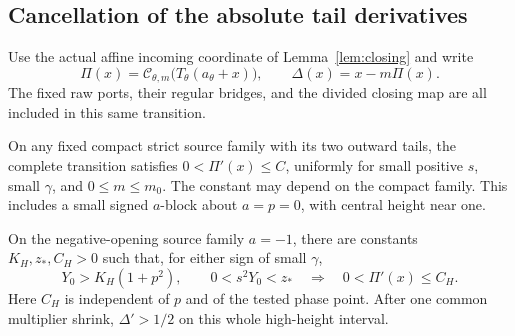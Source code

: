 \subsection{Cancellation of the absolute tail derivatives}
\label{ann:subsec-high-source}

Use the actual affine incoming coordinate of Lemma~\ref{lem:closing}
and write
\[
 \Pi(x)=\mathcal C_{\theta,m}\bigl(T_\theta(a_\theta+x)\bigr),
 \qquad \Delta(x)=x-m\Pi(x).
\]
The fixed raw ports, their regular bridges, and the divided closing map
are all included in this same transition.

\begin{proposition}\label{sharp:upper-high}
On any fixed compact strict source family with its two outward tails,
the complete transition satisfies \(0<\Pi'(x)\le C\), uniformly for
small positive \(s\), small \(\gamma\), and \(0\le m\le m_0\).
The constant may depend
on the compact family. This includes a small signed \(a\)-block about
\(a=p=0\), with central height near one.

On the negative-opening source family \(a=-1\), there are constants
\(K_H,z_*,C_H>0\) such that, for either sign of small \(\gamma\),
\[
 Y_0>K_H(1+p^2),\qquad 0<s^2Y_0<z_*
 \quad\Longrightarrow\quad 0<\Pi'(x)\le C_H.
\]
Here \(C_H\) is independent of \(p\) and of the tested phase point.
After one common multiplier shrink, \(\Delta'>1/2\) on this whole
high-height interval.
\end{proposition}
